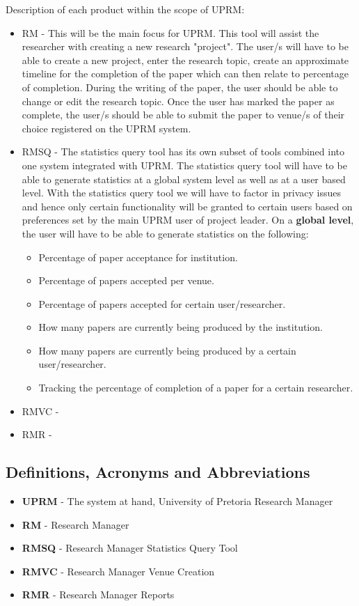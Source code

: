 		\begin{paragraph}{}
			Description of each product within the scope of UPRM:
				\begin{itemize}
					\item RM -
						This will be the main focus for UPRM. This tool will assist the researcher with creating a new research "project". 
						The user/s will have to be able to create a new project, enter the research topic, create an approximate timeline for the completion of the paper which can then relate to percentage of completion. During the writing of the paper, the user should be able to change or edit the research topic. Once the user has marked the paper as complete, the user/s should be able to submit the paper to venue/s of their choice registered on the UPRM system.
					\item RMSQ -
						The statistics query tool has its own subset of tools combined into one system integrated with UPRM. The statistics query tool will have to be able to generate statistics at a global system level as well as at a user based level. With the statistics query tool we will have to factor in privacy issues and hence only certain functionality will be granted to certain users based on preferences set by the main UPRM user of project leader. On a \textbf{global level}, the user will have to be able to generate statistics on the following: 
							\begin{itemize}
								\item Percentage of paper acceptance for institution.
								\item Percentage of papers accepted per venue.
								\item Percentage of papers accepted for certain user/researcher.
								\item How many papers are currently being produced by the institution.
								\item How many papers are currently being produced by a certain user/researcher.
								\item Tracking the percentage of completion of a paper for a certain researcher.
							\end{itemize}
					\item RMVC -
					\item RMR -
				\end{itemize}
		\end{paragraph}

	\subsection{Definitions, Acronyms and Abbreviations}
		\begin{itemize}
			\item{\textbf{UPRM}} - The system at hand, University of Pretoria Research Manager
			\item{\textbf{RM}} - Research Manager 
			\item{\textbf{RMSQ}} - Research Manager Statistics Query Tool
			\item{\textbf{RMVC}} - Research Manager Venue Creation
			\item{\textbf{RMR}} - Research Manager Reports
		\end{itemize}
